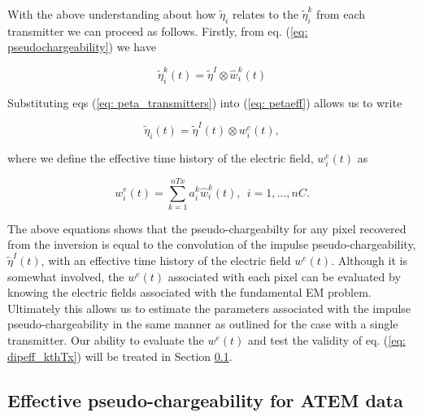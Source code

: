 \documentclass[extra,mreferee]{gji}
\newcommand{\peta}{\tilde{\eta}}
\begin{document}
With the above understanding about how $\peta_i$ relates to the $\peta_i^k$ from each transmitter we can proceed  as follows. Firstly, from eq. (\ref{eq: pseudochargeability}) we have 
\begin{linenomath*}
\begin{equation}
  \peta_i^k(t) =\peta^I \otimes \hat{w}^{k}_i(t) 
  \label{eq: peta_transmitters}
\end{equation}
\end{linenomath*}
Substituting eqs (\ref{eq: peta_transmitters}) into (\ref{eq: petaeff}) allows us to write
\begin{linenomath*}
\begin{equation}
  \peta_i(t) = \peta^I(t) \otimes w^e_i(t),
  \label{eq: peta_eff}
\end{equation}
\end{linenomath*}
where we define the effective time history of the electric field, $w^e_i(t)$ as 
\begin{linenomath*}
\begin{equation}
  w^e_i(t)= \sum_{k=1}^{nTx} a^k_i \hat{w}^{k}_i(t), \ \ i=1, \ldots, nC.
  \label{eq: we_eff}
\end{equation}
\end{linenomath*}

The above equations shows that the pseudo-chargeabilty for any pixel recovered from the inversion is equal to the convolution of the impulse pseudo-chargeability, $\peta^I(t)$, with an effective time history of the electric field $w^e(t)$. Although it is somewhat involved, the $w^e(t)$ associated with each pixel can be evaluated by knowing the electric fields associated with the fundamental EM problem. Ultimately this allows us to estimate the parameters associated with the impulse pseudo-chargeability in the same manner as outlined for the case with a single transmitter. Our ability to evaluate the $w^e(t)$ and test the validity of eq. (\ref{eq: dipeff_kthTx}) will be treated in Section \ref{subsection: Effective pseudo-chargeability for ATEM data}.  


\subsection{Effective pseudo-chargeability for ATEM data}
\label{subsection: Effective pseudo-chargeability for ATEM data}
\end{document}
